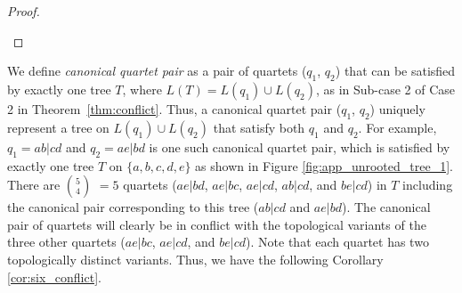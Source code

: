 \documentclass[runningheads]{llncs}
\newcommand{\add}[1]{{\color{blue} #1}}
\begin{document}
\begin{appendices}
\begin{proof}
\begin{itemize}
\begin{itemize}
 
\end{itemize}



\end{itemize}

\end{proof}

We define \textit{canonical quartet pair} as a pair of quartets ($q_1$, $q_2$) that can be satisfied by exactly one tree $T$, where $L(T) = L(q_1) \cup L(q_2)$, as in Sub-case 2 of Case 2 in Theorem~\ref{thm:conflict}. Thus, a canonical quartet pair ($q_1$, $q_2$) uniquely represent a tree on $L(q_1) \cup L(q_2)$ that satisfy both $q_1$ and $q_2$. For example, $q_1 = ab|cd$ and $q_2 = ae|bd$ %
is one such canonical quartet pair, which is satisfied by exactly one tree $T$ on $\{a,b,c,d,e\}$ as shown in Figure \ref{fig:app_unrooted_tree_1}. There are $5 \choose 4$ $=5$ quartets ($ae|bd$, $ae|bc$, $ae|cd$, $ab|cd$, and $be|cd$) in $T$ including the canonical pair corresponding to this tree ($ab|cd$ and $ae|bd$). The canonical pair of quartets will clearly be in conflict with the topological variants of the three other quartets ($ae|bc$, $ae|cd$, and $be|cd$). Note that each quartet has two topologically distinct variants. Thus, we have the following Corollary \ref{cor:six_conflict}.






\end{appendices}
\end{document}
